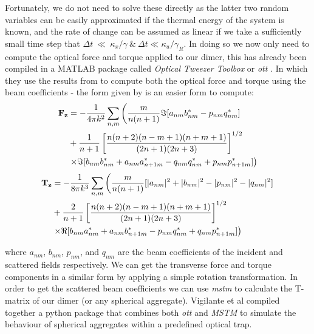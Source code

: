 Fortunately, we do not need to solve these directly as the latter two
random variables can be easily approximated if the thermal energy of
the system is known, and the rate of change can be assumed as linear if
we take a sufficiently small time step that
$\Delta t~\ll~\kappa_x/\gamma \ \& \ \Delta t \ll
\kappa_u/\gamma_R$. In doing so we now only need to compute the
optical force and torque applied to our dimer, this has already been
compiled in a MATLAB package called \textit{Optical Tweezer Toolbox}
or \textit{ott} \cite{Nieminen2007}. In which they use the results
from \cite{Farsund1996} to compute both the optical force and torque
using the beam coefficients - the form given by
\cite{Crichton2000THEMD} is an easier form to compute:
\begin{equation}
\begin{split}
  \bold{F_z}
  &=
    -\frac{1}{4\pi k^2}\sum_{n,m} \left(\frac{m}{n(n+1)}\Im[a_{nm}b^*_{nm}-p_{nm}q^*_{nm}] \right.
  \\ 
  &+\frac{1}{n+1}\left[\frac{n(n+2)(n-m+1)(n+m+1)}{(2n+1)(2n+3)} \right]^{1/2}
  \\
  & \left.\times\Im[b_{nm}b^*_{nm}+a_{nm}a^*_{n+1m}-q_{nm}q^*_{nm}+p_{nm}p^*_{n+1m}] \right)
\end{split}
\end{equation}
\begin{equation}
\begin{split}
  \bold{T_z}
  &=
    -\frac{1}{8\pi k^3}\sum_{n,m} \left(\frac{m}{n(n+1)}[|a_{nm}|^2+|b_{nm}|^2-|p_{nm}|^2-|q_{nm}|^2] \right.
  \\ 
  &+\frac{2}{n+1}\left[\frac{n(n+2)(n-m+1)(n+m+1)}{(2n+1)(2n+3)} \right]^{1/2}
  \\
  & \left.\times\Re[b_{nm}a^*_{nm}+a_{nm}b^*_{n+1m}-p_{nm}q^*_{nm}+q_{nm}p^*_{n+1m}] \right)
\end{split}
\end{equation}

where $a_{nm}$, $b_{nm}$, $p_{nm}$, and $q_{nm}$ are the beam coefficients
of the incident and scattered fields respectively. We can get the transverse 
force and torque components in a similar form by applying a simple rotation 
transformation. In order to get the scattered beam coefficients we can use 
\textit{mstm} \cite{Mackowski2011} to calculate the T-matrix of our dimer 
(or any spherical aggregate). Vigilante et al compiled together a python 
package that combines both \textit{ott} and \textit{MSTM} to simulate the 
behaviour of spherical aggregates within a predefined optical trap. 

